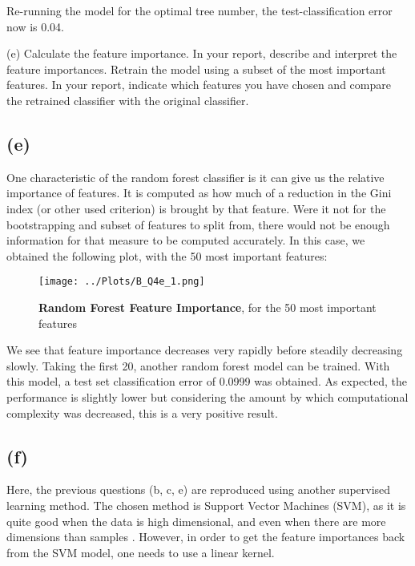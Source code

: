 \documentclass[12pt]{report} %
\begin{document}
Re-running the model for the optimal tree number, the test-classification error now is 0.04.


(e) Calculate the feature importance. In your report, describe and interpret the feature importances. Retrain the model using a subset of the most important features. In your report, indicate which features you have chosen and compare the retrained classifier with the original classifier.


\subsection*{(e)}

One characteristic of the random forest classifier is it can give us the relative importance of features. It is computed as how much of a reduction in the Gini index (or other used criterion) is brought by that feature. Were it not for the bootstrapping and subset of features to split from, there would not be enough information for that measure to be computed accurately\cite[pp. 345-346]{james2013introduction}. In this case, we obtained the following plot, with the 50 most important features:

\begin{figure}[htbp]
    \centering
    \texttt{[image: ../Plots/B\_Q4e\_1.png]}
    \caption{\textbf{Random Forest Feature Importance}, for the 50 most important features}
\end{figure}

We see that feature importance decreases very rapidly before steadily decreasing slowly. Taking the first 20, another random forest model can be trained. With this model, a test set classification error of 0.0999 was obtained. As expected, the performance is slightly lower but considering the amount by which computational complexity was decreased, this is a very positive result.


\subsection*{(f)}

Here, the previous questions (b, c, e) are reproduced using another supervised learning method. The chosen method is Support Vector Machines (SVM), as it is quite good when the data is high dimensional, and even when there are more dimensions than samples \cite{svm_sklearn}. However, in order to get the feature importances back from the SVM model, one needs to use a linear kernel. 
\end{document}
